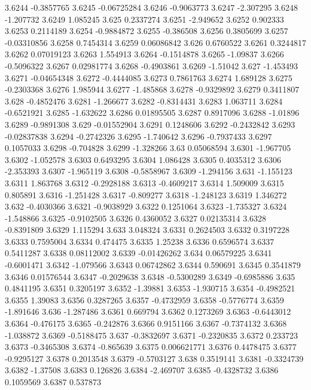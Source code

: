 3.6244  -0.3857765
3.6245  -0.06725284
3.6246  -0.9063773
3.6247  -2.307295
3.6248  -1.207732
3.6249  1.085245
3.625  0.2337274
3.6251  -2.949652
3.6252  0.902333
3.6253  0.2114189
3.6254  -0.9884872
3.6255  -0.386508
3.6256  0.3805699
3.6257  -0.03310856
3.6258  0.7454314
3.6259  0.06086842
3.626  0.6760522
3.6261  0.3244817
3.6262  0.07019123
3.6263  1.554913
3.6264  -0.1514878
3.6265  -1.09837
3.6266  -0.5096322
3.6267  0.02981774
3.6268  -0.4903861
3.6269  -1.51042
3.627  -1.453493
3.6271  -0.04654348
3.6272  -0.4444085
3.6273  0.7861763
3.6274  1.689128
3.6275  -0.2303368
3.6276  1.985944
3.6277  -1.485868
3.6278  -0.9329892
3.6279  0.3411807
3.628  -0.4852476
3.6281  -1.266677
3.6282  -0.8314431
3.6283  1.063711
3.6284  -0.6521921
3.6285  -1.632622
3.6286  0.01895505
3.6287  0.8917096
3.6288  -1.01896
3.6289  -0.9891308
3.629  -0.01552904
3.6291  0.1248606
3.6292  -0.2432842
3.6293  -0.02837838
3.6294  -0.2742326
3.6295  -1.740642
3.6296  -0.7937433
3.6297  0.1057033
3.6298  -0.704828
3.6299  -1.328266
3.63  0.05068594
3.6301  -1.967705
3.6302  -1.052578
3.6303  0.6493295
3.6304  1.086428
3.6305  0.4035312
3.6306  -2.353393
3.6307  -1.965119
3.6308  -0.5858967
3.6309  -1.294156
3.631  -1.155123
3.6311  1.863768
3.6312  -0.2928188
3.6313  -0.4609217
3.6314  1.509009
3.6315  0.805891
3.6316  -1.251428
3.6317  -0.809277
3.6318  -1.248123
3.6319  1.346272
3.632  -0.4030366
3.6321  -0.9038929
3.6322  0.1251064
3.6323  -1.735327
3.6324  -1.548866
3.6325  -0.9102505
3.6326  0.4360052
3.6327  0.02135314
3.6328  -0.8391809
3.6329  1.115294
3.633  3.048324
3.6331  0.2624503
3.6332  0.3197228
3.6333  0.7595004
3.6334  0.474475
3.6335  1.25238
3.6336  0.6596574
3.6337  0.5411287
3.6338  0.08112002
3.6339  -0.01426262
3.634  0.06579225
3.6341  -0.6001471
3.6342  -1.079566
3.6343  0.06742862
3.6344  0.590691
3.6345  0.3541879
3.6346  0.01576544
3.6347  -0.2029638
3.6348  -0.5300289
3.6349  -0.6985886
3.635  0.4841195
3.6351  0.3205197
3.6352  -1.39881
3.6353  -1.930715
3.6354  -0.4982521
3.6355  1.39083
3.6356  0.3287265
3.6357  -0.4732959
3.6358  -0.5776774
3.6359  -1.891646
3.636  -1.287486
3.6361  0.669794
3.6362  0.1273269
3.6363  -0.6443012
3.6364  -0.476175
3.6365  -0.242876
3.6366  0.9151166
3.6367  -0.7374132
3.6368  -1.038872
3.6369  -0.5188475
3.637  -0.3832697
3.6371  -0.2320835
3.6372  0.233723
3.6373  -0.3465308
3.6374  -0.865639
3.6375  0.006621771
3.6376  0.4478475
3.6377  -0.9295127
3.6378  0.2013548
3.6379  -0.5703127
3.638  0.3519141
3.6381  -0.3324739
3.6382  -1.37508
3.6383  0.126826
3.6384  -2.469707
3.6385  -0.4328732
3.6386  0.1059569
3.6387  0.537873
